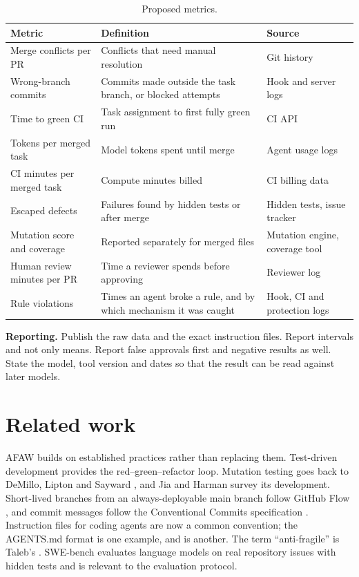 \documentclass[11pt,a4paper]{article}
\newcommand{\code}[1]{\path{#1}}
\begin{document}
\begin{table}[h]
\centering
\small
\begin{tabularx}{\textwidth}{@{}>{\raggedright\arraybackslash}p{4.6cm}>{\raggedright\arraybackslash}X>{\raggedright\arraybackslash}p{3.4cm}@{}}
\toprule
\textbf{Metric} & \textbf{Definition} & \textbf{Source}\\
\midrule
Merge conflicts per PR & Conflicts that need manual resolution & Git history\\
Wrong-branch commits & Commits made outside the task branch, or blocked attempts & Hook and server logs\\
Time to green CI & Task assignment to first fully green run & CI API\\
Tokens per merged task & Model tokens spent until merge & Agent usage logs\\
CI minutes per merged task & Compute minutes billed & CI billing data\\
Escaped defects & Failures found by hidden tests or after merge & Hidden tests, issue tracker\\
Mutation score and coverage & Reported separately for merged files & Mutation engine, coverage tool\\
Human review minutes per PR & Time a reviewer spends before approving & Reviewer log\\
Rule violations & Times an agent broke a rule, and by which mechanism it was caught & Hook, CI and protection logs\\
\bottomrule
\end{tabularx}
\caption{Proposed metrics.}
\label{tab:metrics}
\end{table}

\textbf{Reporting.} Publish the raw data and the exact instruction files. Report intervals and not only means. Report false approvals first and negative results as well. State the model, tool version and dates so that the result can be read against later models.

\section{Related work}

AFAW builds on established practices rather than replacing them. Test-driven development \cite{beck2002} provides the red--green--refactor loop. Mutation testing goes back to DeMillo, Lipton and Sayward \cite{demillo1978}, and Jia and Harman \cite{jia2011} survey its development. Short-lived branches from an always-deployable main branch follow GitHub Flow \cite{chacon2011}, and commit messages follow the Conventional Commits specification \cite{conventionalcommits}. Instruction files for coding agents are now a common convention; the AGENTS.md format \cite{agentsmd} is one example, and \code{CLAUDE.md} is another. The term ``anti-fragile'' is Taleb's \cite{taleb2012}. SWE-bench \cite{jimenez2024} evaluates language models on real repository issues with hidden tests and is relevant to the evaluation protocol.
\end{document}
